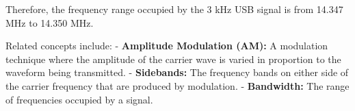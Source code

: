 Therefore, the frequency range occupied by the 3 kHz USB signal is from 14.347 MHz to 14.350 MHz.

Related concepts include:
- \textbf{Amplitude Modulation (AM):} A modulation technique where the amplitude of the carrier wave is varied in proportion to the waveform being transmitted.
- \textbf{Sidebands:} The frequency bands on either side of the carrier frequency that are produced by modulation.
- \textbf{Bandwidth:} The range of frequencies occupied by a signal.

